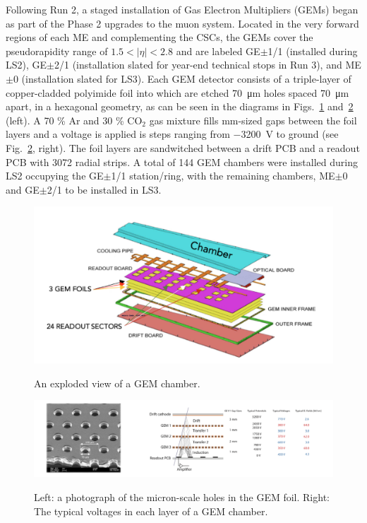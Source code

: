Following Run 2, a staged installation of Gas Electron Multipliers (GEMs) \cite{GEM} began as part of the Phase 2 upgrades to the muon system. Located in the very forward regions of each ME and complementing the CSCs, the GEMs cover the pseudorapidity range of $1.5<|\eta|<2.8$ and are labeled GE$\pm$1/1 (installed during LS2), GE$\pm$2/1 (installation slated for year-end technical stops in Run 3), and ME$\pm$0 (installation slated for LS3). Each GEM detector consists of a triple-layer of copper-cladded polyimide foil into which are etched \SI{70}{\micro \meter} holes spaced \SI{70}{\micro\meter} apart, in a hexagonal geometry, as can be seen in the diagrams in Figs.~\ref{fig:GEMDiagram} and~\ref{fig:GEMDiagram2} (left). A 70 \% Ar and 30 \% CO$_2$ gas mixture fills mm-sized gaps between the foil layers and a voltage is applied is steps ranging from \SI{-3200}{V} to ground (see Fig.~\ref{fig:GEMDiagram2}, right). The foil layers are sandwitched between a drift PCB and a readout PCB with 3072 radial strips. A total of 144 GEM chambers were installed during LS2 occupying the GE$\pm$1/1 station/ring, with the remaining chambers, ME$\pm$0 and GE$\pm$2/1 to be installed in LS3. 

\begin{figure}[H]
    \centering
    {\includegraphics[width=\textwidth]{Images/CMS/GEMDiagram.png}}
    \caption{An exploded view of a GEM chamber.}
    \label{fig:GEMDiagram}
\end{figure}

\begin{figure}[H]
    \centering
    {\includegraphics[width=\textwidth]{Images/CMS/GEMDiagram2.png}}
    \caption{Left: a photograph of the micron-scale holes in the GEM foil. Right: The typical voltages in each layer of a GEM chamber.}
    \label{fig:GEMDiagram2}
\end{figure}